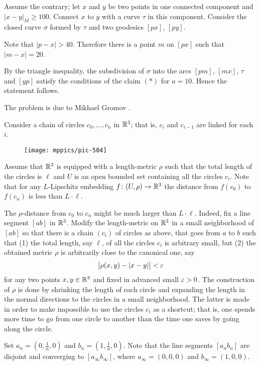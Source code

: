 Assume the contrary; let $x$ and $y$ be two points in one connected component 
and $|x-y|_M\ge 100$.
Connect $x$ to $y$ with a curve $\tau$ in this component.
Consider the closed curve $\sigma$ formed by $\tau$ and two geodesics $[px]$, $[py]$.


Note that $|p-x|>40$.
Therefore there is a point $m$ on $[px]$ such that $|m-x|=20$.

By the triangle inequality, the subsdivision of $\sigma$ into the arcs $[pm]$, $[mx]$, $\tau$ and $[yp]$ satisfy the conditions of the claim $({*})$ for $a=10$.
Hence the statement follows.\qeds

The problem is due to Mikhael Gromov \cite[Appendix 1(E$_{2}$)]{gromov-filling}.

Consider a chain of circles $c_0,\dots,c_n$ in $\mathbb{R}^3$;
that is, $c_i$ and $c_{i-1}$ are linked for each $i$. 
\begin{figure}[h!]
\vskip0mm
\centering
\texttt{[image: mppics/pic-504]}
\end{figure}

Assume that $\mathbb{R}^3$ is equipped with a length-metric $\rho$ such that the total length of the circles is $\ell$
and $U$ is an open bounded set containing all the circles $c_i$.
Note that for any $L$-Lipschitz embedding $f\:(U,\rho)\z\to\RR^3$ the distance from $f(c_0)$ to $f(c_n)$ is less than $L\cdot\ell$.

The $\rho$-distance from $c_0$ to $c_n$ might be much larger than $L\cdot\ell$.
Indeed, fix a line segment $[ab]$ in $\mathbb{R}^3$.
Modify 
the length-metric on $\mathbb{R}^3$ in a small neighborhood of $[ab]$
so that there is a chain $(c_i)$ of circles as above,
that goes from $a$ to $b$ 
such that
(1) the total length, say $\ell$, 
of all the circles $c_i$ is arbitrary small,
but 
(2) the obtained metric $\rho$ 
is arbitrarily close to the canonical one, say
\[\bigl|\rho(x,y)-|x-y|\bigr|<\varepsilon\]
for any two points $x,y\in\mathbb{R}^3$
and fixed in advanced small $\varepsilon>0$.
The construction of $\rho$ 
is done by shrinking the length of each circle
and expanding the length in the normal directions  
to the circles in a small neighborhood.
The latter is made in order to make impossible to use the circles $c_i$ as a shortcut;
that is, one spends more time to go from one circle to another 
than the time one saves by going along the circle.

Set $a_n=(0,\tfrac1n,0)$ and $b_n=(1,\tfrac1n,0)$.
Note that the line segments $[a_nb_n]$ are disjoint and converging
to $[a_\infty b_\infty]$,
where $a_\infty=(0,0,0)$ and $b_\infty=(1,0,0)$.

